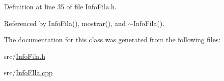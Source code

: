 Definition at line 35 of file InfoFila.h.



Referenced by InfoFila(), mostrar(), and $\sim$InfoFila().



The documentation for this class was generated from the following files:\begin{DoxyCompactItemize}
\item 
src/\hyperlink{InfoFila_8h}{InfoFila.h}\item 
src/\hyperlink{InfoFIla_8cpp}{InfoFIla.cpp}\end{DoxyCompactItemize}

